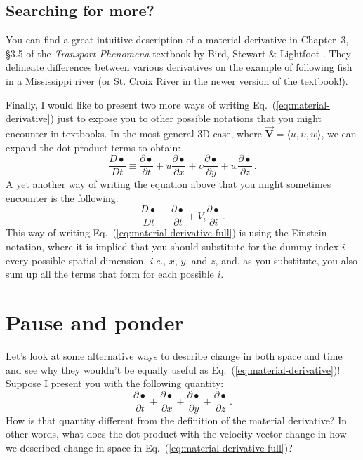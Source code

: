 \begin{mdframed}[style=exercise-frame]

\subsection*{Searching for more?}

You can find a great intuitive description of a material derivative in Chapter~3, \S3.5 of the \textit{Transport Phenomena} textbook by Bird, Stewart \& Lightfoot \cite{bird2002transport}. They delineate differences between various derivatives on the example of following fish in a Mississippi river (or St. Croix River in the newer version of the textbook!).

\end{mdframed}

Finally, I would like to present two more ways of writing Eq.~(\ref{eq:material-derivative}) just to expose you to other possible notations that you might encounter in textbooks. 
In the most general 3D case, where $\vec{\bm{V}} = \langle u, \upsilon, w \rangle$, we can expand the dot product terms to obtain:
\begin{equation} \label{eq:material-derivative-full}
\frac{D \bullet}{D t} \equiv \frac{\partial \bullet}{\partial t} + u \frac{\partial \bullet}{\partial x} + \upsilon \frac{\partial \bullet}{\partial y} + w \frac{\partial \bullet}{\partial z} \, .
\end{equation}
A yet another way of writing the equation above that you might sometimes encounter is the following:
\begin{equation} \label{eq:material-derivative-ein stein}
\frac{D \bullet}{D t} \equiv \frac{\partial \bullet}{\partial t} + V_i \frac{\partial \bullet}{\partial i} \, .
\end{equation}
This way of writing Eq.~(\ref{eq:material-derivative-full}) is using the Einstein notation, where it is implied that you should substitute for the dummy index $i$ every possible spatial dimension, \textit{i.e.}, $x$, $y$, and $z$, and, as you substitute, you also sum up all the terms that form for each possible $i$.

\section{Pause and ponder}

Let's look at some alternative ways to describe change in both space and time and see why they wouldn't be equally useful as Eq.~(\ref{eq:material-derivative})! Suppose I present you with the following quantity:
\begin{equation} \label{eq:all-derivatives}
\frac{\partial \bullet}{\partial t} + \frac{\partial \bullet}{\partial x} + \frac{\partial \bullet}{\partial y} + \frac{\partial \bullet}{\partial z} \, .
\end{equation}
How is that quantity different from the definition of the material derivative? In other words, what does the dot product with the velocity vector change in how we described change in space in Eq.~(\ref{eq:material-derivative-full})?

